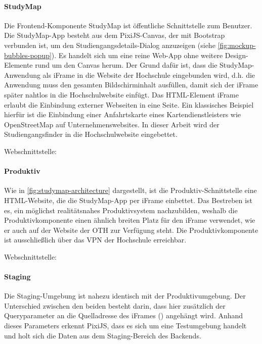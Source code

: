 \paragraph*{StudyMap}
Die Frontend-Komponente StudyMap ist öffentliche Schnittstelle zum Benutzer. Die StudyMap-App besteht aus dem PixiJS-Canvas, der mit Bootstrap verbunden ist, um den Studiengangsdetails-Dialog anzuzeigen (siehe \autoref{fig:mockup-bubbles-popup}). Es handelt sich um eine reine Web-App ohne weitere Design-Elemente rund um den Canvas herum. Der Grund dafür ist, dass die StudyMap-Anwendung als iFrame in die Website der Hochschule eingebunden wird, d.h. die Anwendung muss den gesamten Bildschirminhalt ausfüllen, damit sich der iFrame später nahtlos in die Hochschulwebsite einfügt. Das HTML-Element iFrame erlaubt die Einbindung externer Webseiten in eine Seite. Ein klassisches Beispiel hierfür ist die Einbindung einer Anfahrtskarte eines Kartendienstleisters wie OpenStreetMap auf Unternehmenswebsites. \parencite{mozilla_corporation_iframe_2024} In dieser Arbeit wird der Studiengangsfinder in die Hochschulwebsite eingebettet.

\noindent
Webschnittstelle: 

\paragraph*{Produktiv}
Wie in \autoref{fig:studymap-architecture} dargestellt, ist die Produktiv-Schnittstelle eine HTML-Website, die die StudyMap-App per iFrame einbettet.  Das Bestreben ist es, ein möglichst realitätsnahes Produktivsystem nachzubilden, weshalb die Produktivkomponente einen ähnlich breiten Platz für den iFrame verwendet, wie er auch auf der Website der OTH zur Verfügung steht. Die Produktivkomponente ist ausschließlich über das VPN der Hochschule erreichbar.

\noindent
Webschnittstelle: 

\paragraph*{Staging}
Die Staging-Umgebung ist nahezu identisch mit der Produktivumgebung. Der Unterschied zwischen den beiden besteht darin, dass hier zusätzlich der Queryparameter  an die Quelladresse des iFrames () angehängt wird. Anhand dieses Parameters erkennt PixiJS, dass es sich um eine Testumgebung handelt und holt sich die Daten aus dem Staging-Bereich des Backends.

